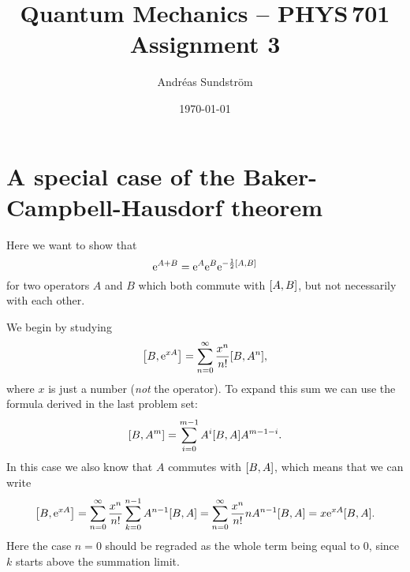 \documentclass[11pt,letter, swedish, english
]{article}
\begin{document}
\title{Quantum Mechanics -- PHYS\,701 \\
Assignment 3}
\author{Andréas Sundström}
\date{\today}

\maketitle



\section{A special case of the Baker-Campbell-Hausdorf theorem}
Here we want to show that
\begin{equation}\label{eq:1_want_this}
\ee^{A+B} = \ee^A\ee^B\ee^{-\frac{1}{2}\comm{A}{B}}
\end{equation}
for two operators $A$ and $B$ which both commute with $\comm{A}{B}$,
but not necessarily with each other.

We begin by studying
\begin{equation}
\comm{B}{\ee^{x A}}=\sum_{n=0}^\infty \frac{x^n}{n!}\comm{B}{A^n},
\end{equation}
where $x$ is just a number (\emph{not} the operator). To expand this
sum we can use the formula derived in the last problem
set\footnotemark{}:
\begin{equation}
\comm{B}{A^{m}} =\sum_{i=0}^{m-1} A^{i}\comm{B}{A}A^{m-1-i}.
\end{equation}
In this case we also know that $A$ commutes with $\comm{B}{A}$, which
means that we can write
\begin{equation}\label{eq:1_comm}
\comm{B}{\ee^{x A}}=\sum_{n=0}^\infty \frac{x^n}{n!}
\sum_{k=0}^{n-1}A^{n-1}\comm{B}{A}
=\sum_{n=0}^\infty \frac{x^n}{n!}
nA^{n-1}\comm{B}{A}
=x\ee^{xA}\comm{B}{A}.
\end{equation}
Here the case $n=0$ should be regraded as the whole term being equal
to $0$, since $k$ starts above the summation limit.
\end{document}
